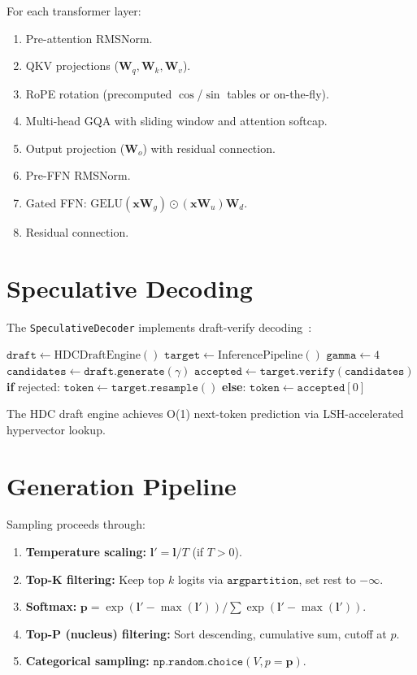 \documentclass[11pt,a4paper,openright]{book}
\begin{document}
For each transformer layer:
\begin{enumerate}
	\item Pre-attention RMSNorm.
	\item QKV projections ($\mathbf{W}_q, \mathbf{W}_k, \mathbf{W}_v$).
	\item RoPE rotation (precomputed $\cos$/$\sin$ tables or on-the-fly).
	\item Multi-head GQA with sliding window and attention softcap.
	\item Output projection ($\mathbf{W}_o$) with residual connection.
	\item Pre-FFN RMSNorm.
	\item Gated FFN: $\text{GELU}(\mathbf{x}\mathbf{W}_g) \odot (\mathbf{x}\mathbf{W}_u) \mathbf{W}_d$.
	\item Residual connection.
\end{enumerate}

\section{Speculative Decoding}

The \texttt{SpeculativeDecoder} implements draft-verify decoding~\cite{leviathan2023speculative}:

\begin{algorithm}[H]
	\caption{Speculative decoding}
	\begin{algorithmic}[1]
		\State $\texttt{draft} \gets \text{HDCDraftEngine}()$
		\State $\texttt{target} \gets \text{InferencePipeline}()$
		\State $\texttt{gamma} \gets 4$
		\State $\texttt{candidates} \gets \texttt{draft.generate}(\gamma)$
		\State $\texttt{accepted} \gets \texttt{target.verify}(\texttt{candidates})$
		\State \textbf{if} rejected: $\texttt{token} \gets \texttt{target.resample}()$
		\State \textbf{else}: $\texttt{token} \gets \texttt{accepted}[0]$
		\EndFor
	\end{algorithmic}
\end{algorithm}

The HDC draft engine achieves O(1) next-token prediction via LSH-accelerated hypervector lookup.

\section{Generation Pipeline}

Sampling proceeds through:
\begin{enumerate}
	\item \textbf{Temperature scaling:} $\mathbf{l}' = \mathbf{l} / T$ (if $T > 0$).
	\item \textbf{Top-K filtering:} Keep top $k$ logits via $\texttt{argpartition}$, set rest to $-\infty$.
	\item \textbf{Softmax:} $\mathbf{p} = \exp(\mathbf{l}' - \max(\mathbf{l}')) / \sum \exp(\mathbf{l}' - \max(\mathbf{l}'))$.
	\item \textbf{Top-P (nucleus) filtering:} Sort descending, cumulative sum, cutoff at $p$.
	\item \textbf{Categorical sampling:} $\texttt{np.random.choice}(V, p=\mathbf{p})$.
\end{enumerate}
\end{document}

